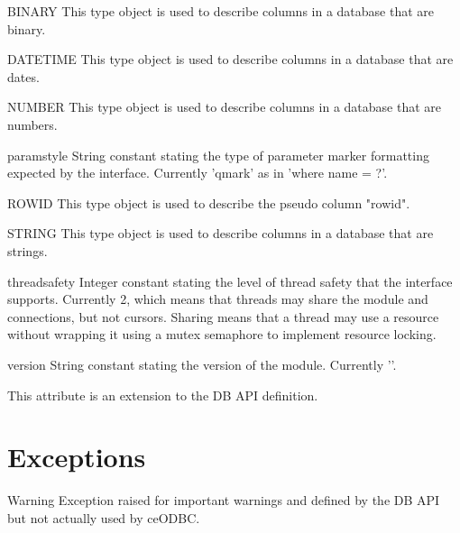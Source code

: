 \documentclass{manual}
\begin{document}
\begin{datadesc}{BINARY}
  This type object is used to describe columns in a database that are binary.
\end{datadesc}

\begin{datadesc}{DATETIME}
  This type object is used to describe columns in a database that are dates.
\end{datadesc}

\begin{datadesc}{NUMBER}
  This type object is used to describe columns in a database that are numbers.
\end{datadesc}

\begin{datadesc}{paramstyle}
  String constant stating the type of parameter marker formatting expected by
  the interface. Currently 'qmark' as in 'where name = ?'.
\end{datadesc}

\begin{datadesc}{ROWID}
  This type object is used to describe the pseudo column "rowid".
\end{datadesc}

\begin{datadesc}{STRING}
  This type object is used to describe columns in a database that are strings.
\end{datadesc}

\begin{datadesc}{threadsafety}
  Integer constant stating the level of thread safety that the interface
  supports. Currently 2, which means that threads may share the module and
  connections, but not cursors. Sharing means that a thread may use a resource
  without wrapping it using a mutex semaphore to implement resource locking.
\end{datadesc}

\begin{datadesc}{version}
  String constant stating the version of the module. Currently '\version{}'.

   This attribute is an extension to the DB API definition.
\end{datadesc}

\section{Exceptions}\label{exceptions}

\begin{datadesc}{Warning}
  Exception raised for important warnings and defined by the DB API but not
  actually used by ceODBC.
\end{datadesc}
\end{document}
